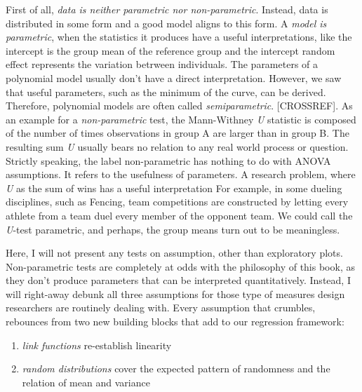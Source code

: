 \documentclass[]{svmono}
\providecommand{\tightlist}{%
  \setlength{\itemsep}{0pt}\setlength{\parskip}{0pt}}
\theoremstyle{definition}
\theoremstyle{definition}
\theoremstyle{definition}
\theoremstyle{remark}
\begin{document}
First of all, \emph{data is neither parametric nor non-parametric}.
Instead, data is distributed in some form and a good model aligns to
this form. A \emph{model is parametric}, when the statistics it produces
have a useful interpretations, like the intercept is the group mean of
the reference group and the intercept random effect represents the
variation betrween individuals. The parameters of a polynomial model
usually don't have a direct interpretation. However, we saw that useful
parameters, such as the minimum of the curve, can be derived. Therefore,
polynomial models are often called \emph{semiparametric}.
{[}CROSSREF{]}. As an example for a \emph{non-parametric} test, the
Mann-Withney \emph{U} statistic is composed of the number of times
observations in group A are larger than in group B. The resulting sum
\emph{U} usually bears no relation to any real world process or
question. Strictly speaking, the label non-parametric has nothing to do
with ANOVA assumptions. It refers to the usefulness of parameters. A
research problem, where \emph{U} as the sum of wins has a useful
interpretation For example, in some dueling disciplines, such as
Fencing, team competitions are constructed by letting every athlete from
a team duel every member of the opponent team. We could call the
\emph{U}-test parametric, and perhaps, the group means turn out to be
meaningless.

Here, I will not present any tests on assumption, other than exploratory
plots. Non-parametric tests are completely at odds with the philosophy
of this book, as they don't produce parameters that can be interpreted
quantitatively. Instead, I will right-away debunk all three assumptions
for those type of measures design researchers are routinely dealing
with. Every assumption that crumbles, rebounces from two new building
blocks that add to our regression framework:

\begin{enumerate}
\def\labelenumi{\arabic{enumi}.}
\tightlist
\item
  \emph{link functions} re-establish linearity
\item
  \emph{random distributions} cover the expected pattern of randomness
  and the relation of mean and variance
\end{enumerate}
\end{document}
